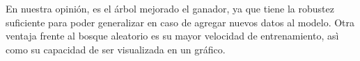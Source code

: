 \documentclass[a4paper]{article}
\begin{document}
    En nuestra opinión, es el árbol mejorado el ganador, ya que tiene la robustez suficiente para poder generalizar en caso de agregar nuevos datos al modelo. Otra ventaja frente al bosque aleatorio es su mayor velocidad de entrenamiento, asì como su capacidad de ser visualizada en un gráfico.
        
\end{document}
